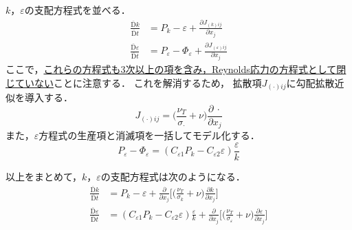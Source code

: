 \documentclass[12pt,a4paper]{jsarticle}
\begin{document}
$k$，$\varepsilon$の支配方程式を並べる．
\begin{align}
  \frac{\overline{\mathrm{D}} k}{\overline{\mathrm{D}} t} &= P_k -\varepsilon +\frac{\partial J_{(k)ij}}{\partial x_j}
  \tag{6.30} \\
  \frac{\overline{\mathrm{D}} \varepsilon}{\overline{\mathrm{D}} t} &= P_\varepsilon -\Phi_\varepsilon +\frac{\partial J_{(\varepsilon)ij}}{\partial x_j}
  \tag{6.39}
\end{align}
ここで，\underline{これらの方程式も3次以上の項を含み，Reynolds応力の方程式として閉じていない}ことに注意する．
これを解消するため，
拡散項$J_{(\cdot)ij}$に勾配拡散近似を導入する．
\begin{equation}
  J_{(\cdot)ij} = \Big( \frac{\nu_T}{\sigma_\cdot} +\nu \Big) \frac{\partial ~\cdot}{\partial x_j}
  \label{eq:GradientDiffusionApproximation} \tag{6.37, 6.46}
\end{equation}
また，$\varepsilon$方程式の生産項と消滅項を一括してモデル化する．
\begin{equation}
  P_\varepsilon -\Phi_\varepsilon = (C_{\varepsilon1}P_k -C_{\varepsilon2}\varepsilon) \frac{\varepsilon}{k}
  \label{eq:Modelinepsilon} \tag{6.45}
\end{equation}

以上をまとめて，$k$，$\varepsilon$の支配方程式は次のようになる．
\begin{align}
  \frac{\overline{\mathrm{D}} k}{\overline{\mathrm{D}} t} &= P_k -\varepsilon +\frac{\partial}{\partial x_j} \Big[ \Big( \frac{\nu_T}{\sigma_k} +\nu \Big) \frac{\partial k}{\partial x_j} \Big]
  \tag{6.50} \\
  \frac{\overline{\mathrm{D}} \varepsilon}{\overline{\mathrm{D}} t} &= (C_{\varepsilon1}P_k -C_{\varepsilon2}\varepsilon) \frac{\varepsilon}{k} +\frac{\partial}{\partial x_j} \Big[ \Big( \frac{\nu_T}{\sigma_\varepsilon} +\nu \Big) \frac{\partial \varepsilon}{\partial x_j} \Big]
  \tag{6.51}
\end{align}

\printbibliography[title=参考文献]
\end{document}
